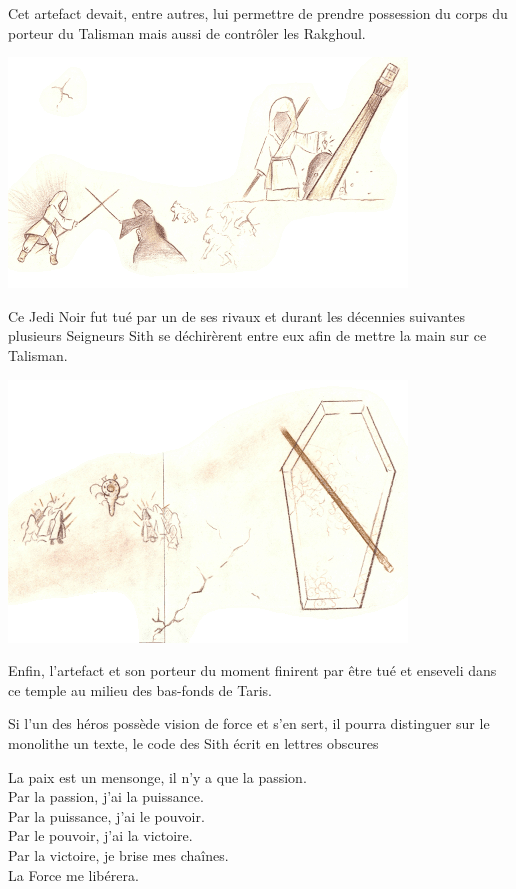 \begin{quotebox}
Cet artefact devait, entre autres, lui permettre de prendre possession du corps du porteur du Talisman mais aussi de contrôler les Rakghoul.

\noindent\includegraphics[width=\linewidth]{_img/places/monolithe-003.png}

Ce Jedi Noir fut tué par un de ses rivaux et durant les décennies suivantes plusieurs Seigneurs Sith se déchirèrent entre eux afin de mettre la main sur ce Talisman. 

\noindent\includegraphics[width=\linewidth]{_img/places/monolithe-004.png}

Enfin, l’artefact et son porteur du moment finirent par être tué et enseveli dans ce temple au milieu des bas-fonds de Taris.
\end{quotebox}

Si l’un des héros possède vision de force et s’en sert, il pourra distinguer sur le monolithe un texte, le code des Sith écrit en lettres obscures
\begin{quotebox}
La paix est un mensonge, il n’y a que la passion. \\
Par la passion, j’ai la puissance. \\
Par la puissance, j’ai le pouvoir. \\
Par le pouvoir, j’ai la victoire. \\
Par la victoire, je brise mes chaînes. \\
La Force me libérera.
\end{quotebox}

